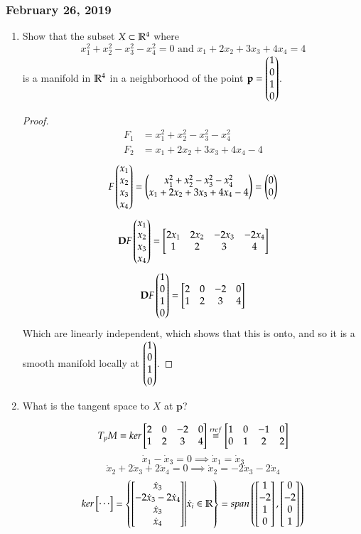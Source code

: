 \subsubsection*{February 26, 2019}

\begin{enumerate}
\item Show that the subset $X\subset \mathbb{R}^4$ where
\[x_1^2+x_2^2-x_3^2-x_4^2=0\text{ and }x_1+2x_2+3x_3+4x_4=4\]
is a manifold in $\mathbb{R}^4$ in a neighborhood of the point $\textbf{p}=\begin{pmatrix} 1 \\ 0 \\ 1 \\ 0 \end{pmatrix}$. 

\begin{proof}
\begin{align*}
F_1 &= x_1^2+x_2^2-x_3^2-x_4^2 \\
F_2 &= x_1+2x_2+3x_3+4x_4 -4
\end{align*}
\[F\begin{pmatrix} x_1 \\ x_2 \\ x_3 \\ x_4 \end{pmatrix}=\begin{pmatrix} x_1^2+x_2^2-x_3^2-x_4^2 \\ x_1+2x_2+3x_3+4x_4 -4 \end{pmatrix} = \begin{pmatrix} 0 \\ 0 \end{pmatrix}\]
\[\textbf{D}F\begin{pmatrix} x_1 \\ x_2 \\ x_3 \\ x_4 \end{pmatrix} = \begin{bmatrix} 2x_1 & 2x_2 & -2x_3 & -2x_4 \\ 1 & 2 & 3 & 4 \end{bmatrix}\]
\[\textbf{D}F\begin{pmatrix} 1 \\ 0 \\ 1 \\ 0 \end{pmatrix} = \begin{bmatrix} 2 & 0 & -2 & 0 \\ 1 & 2 & 3 & 4 \end{bmatrix}\]
Which are linearly independent, which shows that this is onto, and so it is a smooth manifold locally at $\begin{pmatrix} 1 \\ 0 \\ 1 \\ 0 \end{pmatrix}$. 
\end{proof}

\item What is the tangent space to $X$ at $\bm{p}$? 

\[T_pM = ker\begin{bmatrix} 2 & 0 & -2 & 0 \\ 1 & 2 & 3 & 4 \end{bmatrix} \overset{rref}{=}\begin{bmatrix} 1 & 0 & -1 & 0 \\ 0 & 1 & 2 & 2 \end{bmatrix}\]
\[\dot{x}_1-\dot{x}_3=0\implies \dot{x}_1 = \dot{x}_3\]
\[\dot{x}_2+2\dot{x}_3+2\dot{x}_4=0\implies \dot{x}_2=-2\dot{x}_3-2\dot{x}_4\]
\[ker\begin{bmatrix} \cdots \end{bmatrix}=\left\{ \begin{bmatrix} \dot{x}_3 \\ -2\dot{x}_3-2\dot{x}_4 \\ \dot{x}_3 \\ \dot{x}_4 \end{bmatrix} \middle\vert \dot{x}_i\in \mathbb{R} \right\}=span\left( \begin{bmatrix} 1 \\ -2 \\ 1 \\ 0 \end{bmatrix},\begin{bmatrix} 0 \\ -2 \\ 0 \\ 1 \end{bmatrix} \right)\]


\end{enumerate}
